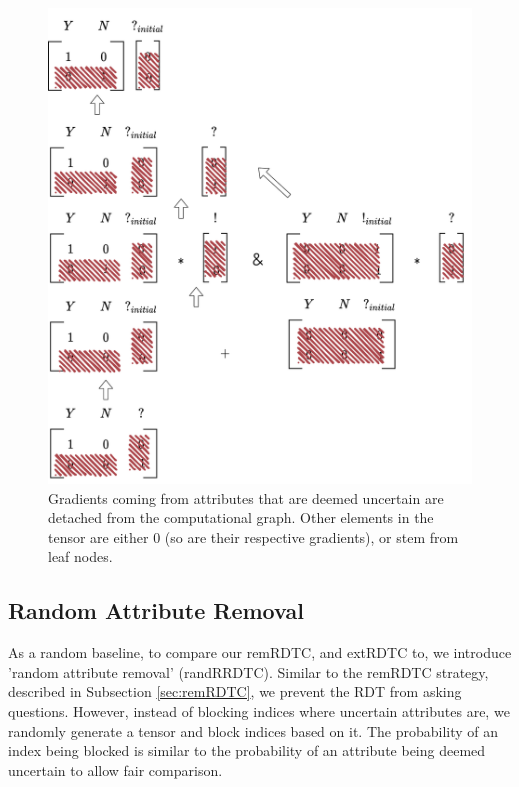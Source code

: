 \documentclass[a4paper,cleardoubleempty,BCOR1cm, 11pt]{report}
\begin{document}
\begin{figure}[t!]
\begin{minipage}{0.45\textwidth}
		\includegraphics[width=1\textwidth]{images/extended_vocab_backward.pdf}
		\caption{Gradients coming from attributes that are deemed uncertain are detached from the computational graph. Other elements in the tensor are either $0$ (so are their respective gradients), or stem from leaf nodes.}
		\label{fig:extended_vocab_backward}
	\end{minipage}
\end{figure}


\subsection{Random Attribute Removal}
As a random baseline, to compare our remRDTC, and extRDTC to, we introduce 'random attribute removal' (randRRDTC).
Similar to the remRDTC strategy, described in Subsection \ref{sec:remRDTC}, we prevent the RDT from asking questions. However, instead of blocking indices where uncertain attributes are, we randomly generate a tensor and block indices based on it. The probability of an index being blocked is similar to the probability of an attribute being deemed uncertain to allow fair comparison.
\end{document}

